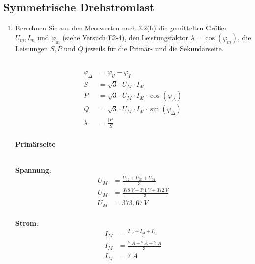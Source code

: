 \subsection{Symmetrische Drehstromlast}
\begin{enumerate}[label=\alph*)]

	\item Berechnen Sie aus den Messwerten nach 3.2(b) die gemittelten Größen $U_m, I_m
		      \text{ und } \varphi_m$ (siehe Versuch E2-4), den Leistungsfaktor $\lambda =
		      \cos(\varphi_m)$, die Leistungen $S, P \text{ und } Q$ jeweils für die Primär-
	      und die Sekundärseite.\\ \ \\
	      \begin{center}
		      \begin{align*}
			      \varphi_{\Delta} & = \varphi_{U} - \varphi_{I}                             \\
			      S                & = \sqrt{3}\cdot U_M\cdot I_M                            \\
			      P                & = \sqrt{3}\cdot U_M\cdot I_M\cdot\cos(\varphi_{\Delta}) \\
			      Q                & = \sqrt{3}\cdot U_M\cdot I_M\cdot\sin(\varphi_{\Delta}) \\
			      \lambda          & = \frac{|P|}{S}                                         \\
		      \end{align*}
	      \end{center}

	      \textbf{Primärseite}\\ \ \\

	      \begin{tcolorbox}[colback=gray!30,
			      colframe=black,
			      width=0.9\textwidth,
		      ]
		      \parbox{\textwidth}{

			      \begin{minipage}{0.5\textwidth}
				      \textbf{Spannung}:
				      \begin{align*}
					      U_M & = \frac{U_{12} + U_{23} + U_{31}}{3} \\
					      U_M & = \frac{378\ V + 371\ V + 372\ V}{3} \\
					      U_M & = 373,67\ V                          \\
				      \end{align*}
			      \end{minipage}\hfill
			      \begin{minipage}{0.5\textwidth}
				      \textbf{Strom}:
				      \begin{align*}
					      I_M & = \frac{I_{12} + I_{23} + I_{31}}{3} \\
					      I_M & = \frac{7\ A + 7\ A + 7\ A}{3}       \\
					      I_M & = 7\ A                               \\
				      \end{align*}
			      \end{minipage}
		      }
	      \end{tcolorbox}


\end{enumerate}
